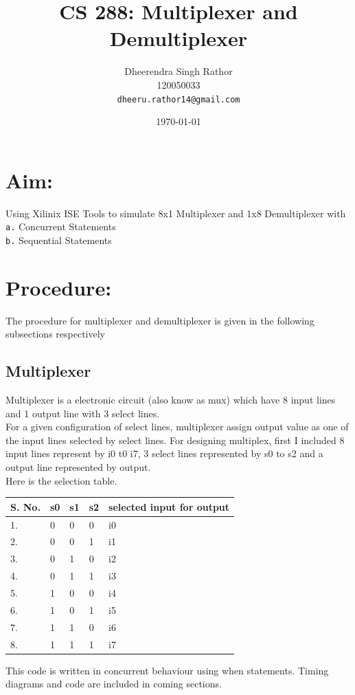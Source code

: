 \documentclass[12pt]{article}
\begin{document}
\title{\vspace{15ex}\Huge{CS 288: Multiplexer and Demultiplexer}\vspace{15ex}}


\author{
  Dheerendra Singh Rathor\\120050033\\
  \texttt{dheeru.rathor14@gmail.com}\\[1 cm]
}

\date{\today}
\maketitle
\newpage

\section{Aim:}
Using Xilinix ISE Tools to simulate 8x1 Multiplexer and 1x8 Demultiplexer with \\
\verb|a.| Concurrent Statements \\
\verb|b.| Sequential Statements 

\section{Procedure:}
The procedure for multiplexer and demultiplexer is given in the following subsections respectively
\subsection{Multiplexer}
Multiplexer is a electronic circuit (also know as mux) which have 8 input lines and 1 output line with 3 select lines.\\
For a given configuration of select lines, multiplexer assign output value as one of the input lines selected by select lines.
For designing multiplex, first I included 8 input lines represent by i0 t0 i7, 3 select lines represented by s0 to s2 and a output 
line represented by output. \\
Here is the selection table.\\ 
\begin{center}
\begin{tabular}{| l | l | l | l | l | }
\hline
S. No. & s0 & s1 & s2 & selected input for output \\ \hline
1. & 0 & 0 & 0 & i0 \\ \hline
2. & 0 & 0 & 1 & i1 \\ \hline
3. & 0 & 1 & 0 & i2 \\ \hline
4. & 0 & 1 & 1 & i3 \\ \hline
5. & 1 & 0 & 0 & i4 \\ \hline
6. & 1 & 0 & 1 & i5 \\ \hline
7. & 1 & 1 & 0 & i6 \\ \hline
8. & 1 & 1 & 1 & i7 \\ \hline
\end{tabular}
\end{center}
This code is written in concurrent behaviour using when statements. 
Timing diagrams and code are included in coming sections.
\end{document}
